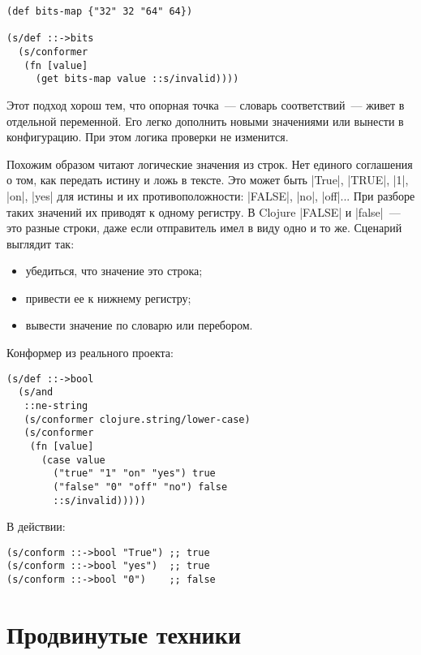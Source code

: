 \begin{verbatim}
(def bits-map {"32" 32 "64" 64})

(s/def ::->bits
  (s/conformer
   (fn [value]
     (get bits-map value ::s/invalid))))
\end{verbatim}

Этот подход хорош тем, что опорная точка~--- словарь соответствий~--- живет в
отдельной переменной. Его легко дополнить новыми значениями или вынести в
конфигурацию. При этом логика проверки не изменится.

Похожим образом читают логические значения из строк. Нет единого соглашения о
том, как передать истину и ложь в тексте. Это может быть \spverb|True|,
\spverb|TRUE|, \spverb|1|, \spverb|on|, \spverb|yes| для истины и их
противоположности: \spverb|FALSE|, \spverb|no|, \spverb|off|... При разборе
таких значений их приводят к одному регистру. В Clojure \spverb|FALSE| и
\spverb|false|~--- это разные строки, даже если отправитель имел в виду одно и
то же. Сценарий выглядит так:

\begin{itemize}

\item
  убедиться, что значение это строка;

\item
  привести ее к нижнему регистру;

\item
  вывести значение по словарю или перебором.

\end{itemize}

\noindent
Конформер из реального проекта:

\begin{verbatim}
(s/def ::->bool
  (s/and
   ::ne-string
   (s/conformer clojure.string/lower-case)
   (s/conformer
    (fn [value]
      (case value
        ("true" "1" "on" "yes") true
        ("false" "0" "off" "no") false
        ::s/invalid)))))

\end{verbatim}

\noindent
В действии:

\begin{verbatim}
(s/conform ::->bool "True") ;; true
(s/conform ::->bool "yes")  ;; true
(s/conform ::->bool "0")    ;; false
\end{verbatim}


\section{Продвинутые техники}

